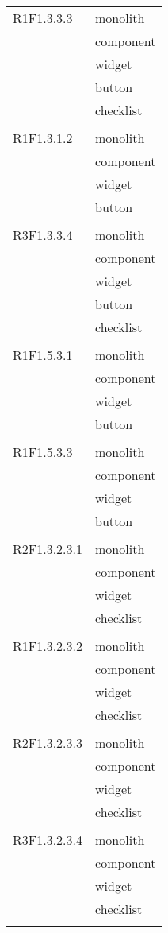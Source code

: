 \begin{center}
\begin{longtable}{|p{7cm}|p{5cm}|}
		R1F1.3.3.3 & monolith \\ & component \\ & widget \\ & button \\ & checklist \\ & \\ \hline
		R1F1.3.1.2 & monolith \\ & component \\ & widget \\ & button \\ & \\ \hline
		R3F1.3.3.4 & monolith \\ & component \\ & widget \\ & button \\ & checklist \\ & \\ \hline
		R1F1.5.3.1 & monolith \\ & component \\ & widget \\ & button \\ & \\ \hline
		R1F1.5.3.3 & monolith \\ & component \\ & widget \\ & button \\ & \\ \hline
		R2F1.3.2.3.1 & monolith \\ & component \\ & widget \\ & checklist \\ & \\ \hline
		R1F1.3.2.3.2 & monolith \\ & component \\ & widget \\ & checklist \\ & \\ \hline
		R2F1.3.2.3.3 & monolith \\ & component \\ & widget \\ & checklist \\ & \\ \hline
		R3F1.3.2.3.4 & monolith \\ & component \\ & widget \\ & checklist \\ & \\ \hline

\end{longtable}
\end{center}
